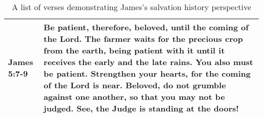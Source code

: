 \begin{table}
    \footnotesize
    \begin{center}
        \begin{tabulary}{\linewidth}{lL}
            \toprule
James 5:7-9 & Be patient, therefore, 
beloved, until the coming of the Lord. The farmer waits for the precious crop 
from the earth, being patient with it until it receives the early and the late 
rains. You also must be patient. Strengthen your hearts, for the coming of the 
Lord is near. Beloved, do not grumble against one another, so that you may not 
be judged. See, the Judge is standing at the doors! \\
            \bottomrule
        \end{tabulary}
    \end{center}
    \caption{A list of verses demonstrating James's salvation history perspective}
    \label{tab:shp-james}
\end{table}

